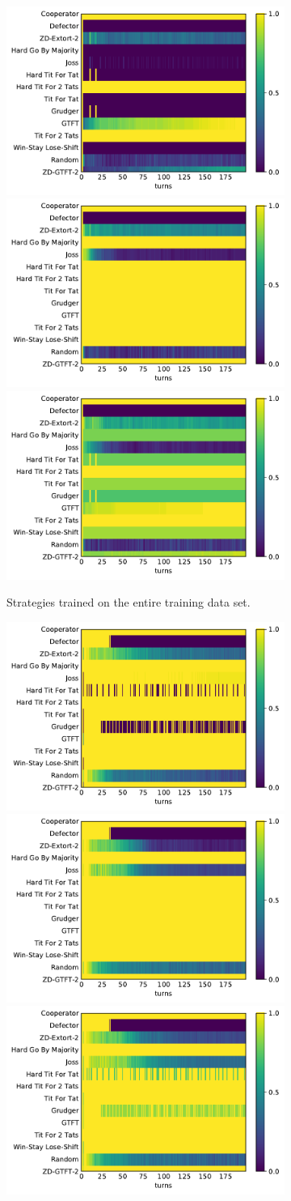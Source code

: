 \begin{figure}[!htbp]
    \begin{subfigure}{\textwidth}
        \includegraphics[width=.3\textwidth]{src/chapters/07/img/stewart_lstm_classification_0.pdf}
        \includegraphics[width=.3\textwidth]{src/chapters/07/img/stewart_lstm_classification_1.pdf}
        \includegraphics[width=.3\textwidth]{src/chapters/07/img/stewart_lstm_classification_0_78.pdf}
        \caption{Strategies trained on the entire training data set.}
    \end{subfigure}
    \begin{subfigure}{\textwidth}
        \includegraphics[width=.3\textwidth]{src/chapters/07/img/stewart_top_twenty_classification_0.pdf}
        \includegraphics[width=.3\textwidth]{src/chapters/07/img/stewart_top_twenty_classification_1.pdf}
        \includegraphics[width=.3\textwidth]{src/chapters/07/img/stewart_top_twenty_classification_0_78.pdf}

\end{subfigure}
\end{figure}
